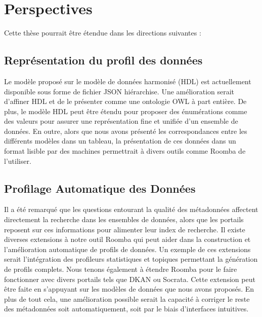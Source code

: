 \section{Perspectives}

Cette th\`{e}se pourrait \^{e}tre \'{e}tendue dans les directions suivantes :

\subsection{Repr\'{e}sentation du profil des donn\'{e}es}
Le mod\`{e}le propos\'{e} sur le mod\`{e}le de donn\'{e}es harmonis\'{e} (HDL) est actuellement disponible sous forme de fichier JSON hi\'{e}rarchise. Une am\'{e}lioration serait d'affiner HDL et de le pr\'{e}senter comme une ontologie OWL \`{a} part enti\`{e}re. De plus, le mod\`{e}le HDL peut \^{e}tre \'{e}tendu pour proposer des \'{e}num\'{e}rations comme des valeurs pour assurer une repr\'{e}sentation fine et unifi\'{e}e d'un ensemble de donn\'{e}es. En outre, alors que nous avons pr\'{e}sent\'{e} les correspondances entre les diff\'{e}rents mod\`{e}les dans un tableau, la pr\'{e}sentation de ces donn\'{e}es dans un format lisible par des machines permettrait \`{a} divers outils comme Roomba de l'utiliser.

\subsection{Profilage Automatique des Donn\'{e}es}
Il a \'{e}t\'{e} remarqu\'{e} que les questions entourant la qualit\'{e} des m\'{e}tadonn\'{e}es affectent directement la recherche dans les ensembles de donn\'{e}es, alors que les portails reposent sur ces informations pour alimenter leur index de recherche. Il existe diverses extensions \`{a} notre outil Roomba qui peut aider dans la construction et l'am\'{e}lioration automatique de profils de donn\'{e}es. Un exemple de ces extensions serait l'int\'{e}gration des profileurs statistiques et topiques permettant la g\'{e}n\'{e}ration de profils complets. Nous tenons \'{e}galement \`{a} \'{e}tendre Roomba pour le faire fonctionner avec divers portails tels que DKAN ou Socrata. Cette extension peut \^{e}tre faite en s'appuyant sur les mod\`{e}les de donn\'{e}es que nous avons propos\'{e}s. En plus de tout cela, une am\'{e}lioration possible serait la capacit\'{e} \`{a} corriger le reste des m\'{e}tadonn\'{e}es soit automatiquement, soit par le biais d'interfaces intuitives.

